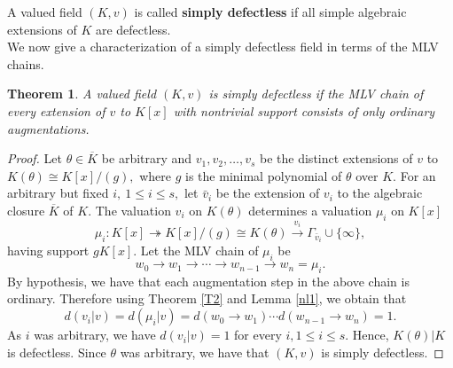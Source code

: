 \documentclass[11pt]{amsart}
\newtheorem{theorem}{Theorem}[section]
\theoremstyle{definition}
\theoremstyle{remark}
\numberwithin{equation}{section}
\begin{document}
	A valued field $(K,v)$ is called {\bf simply defectless} if all simple algebraic extensions of $K$ are defectless.\\
	We now give a characterization of a simply defectless field in terms of the MLV chains.
	\begin{theorem}
		A valued field $(K,v)$ is simply defectless if the MLV chain of every extension of $v$ to $K[x]$ with nontrivial support consists of only ordinary augmentations.
	\end{theorem}
	\begin{proof}
	Let $\theta \in \overline{K}$ be arbitrary and $v_1, v_2,\ldots, v_s$ be the distinct extensions of $v$ to $K(\theta)\cong K[x]/(g),$ where $g$ is the minimal polynomial of $\theta$ over $K.$ For an arbitrary but fixed $i, \ 1\leq i\leq s,$ let $\bar{v}_i$ be the extension of $v_i$ to the algebraic closure $\overline{K}$ of $K.$ 
	The valuation $v_i$ on $K(\theta)$ determines a valuation $\mu_i$ on $K[x]$\[\mu_i:K[x]\twoheadrightarrow K[x]/(g)\cong K(\theta)\xrightarrow{v_i} \Gamma_{\bar{v}_i}\cup\{ \infty \}, 
	\] having support $gK[x].$ Let the MLV chain of $\mu_i$ be 
	\[w_0\longrightarrow w_1 \longrightarrow \cdots \longrightarrow w_{n-1} \longrightarrow w_n=\mu_i.\] By hypothesis, we have that each augmentation step in the above chain is ordinary. Therefore using Theorem \ref{T2} and Lemma \ref{nl1}, we obtain that	\[
	d(v_i|v) =d(\mu_i|v)=d(w_0\longrightarrow w_1)\cdots d(w_{n-1}\longrightarrow w_n) =1 .\]
	As $i$ was arbitrary, we have $d(v_i|v)=1$ for every $i,1\leq i\leq s.$ Hence, $K(\theta)|K$ is defectless. Since $\theta$ was arbitrary, we have that $(K,v)$ is simply defectless.		
	\end{proof}
	
\end{document}
